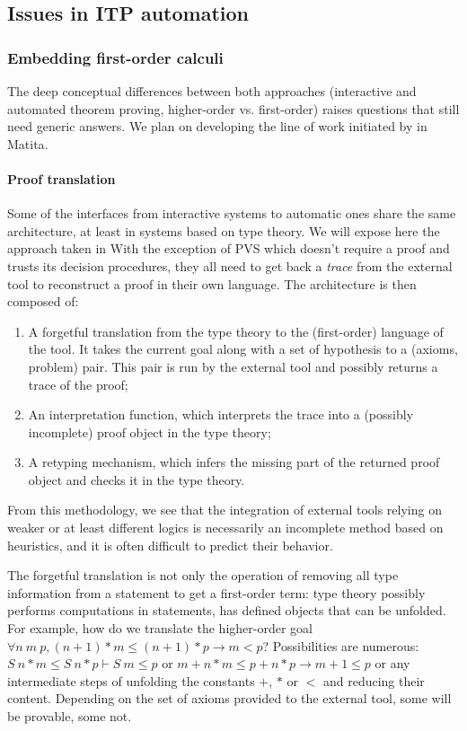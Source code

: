 \documentclass[twoside,a4paper,12pt]{article}
\begin{document}
\subsection{Issues in ITP automation}

\subsubsection{Embedding first-order calculi}

The deep conceptual differences between both approaches (interactive
and automated theorem proving, higher-order vs. first-order) raises
questions that still need generic answers. We plan on developing the
line of work initiated by \cite{asperti2010paramodulation} in
\textsf{Matita}.

\paragraph{Proof translation}

Some of the interfaces from interactive systems to automatic ones
share the same architecture, at least in systems based on type theory.
We will expose here the approach taken in
\cite{asperti2010paramodulation} With the exception of \textsf{PVS}
which doesn't require a proof and trusts its decision procedures, they
all need to get back a \emph{trace} from the external tool to
reconstruct a proof in their own language. The architecture is then
composed of:
\begin{enumerate}
\item A forgetful translation from the type theory to the
  (first-order) language of the tool. It takes the current goal along
  with a set of hypothesis to a (axioms, problem) pair. This pair is
  run by the external tool and possibly returns a trace of the proof;
\item An interpretation function, which interprets the trace into a
  (possibly incomplete) proof object in the type theory;
\item A retyping mechanism, which infers the missing part of the
  returned proof object and checks it in the type theory.
\end{enumerate}

From this methodology, we see that the integration of external tools
relying on weaker or at least different logics is necessarily an
incomplete method based on heuristics, and it is often difficult to
predict their behavior.

The forgetful translation is not only the operation of removing all
type information from a statement to get a first-order term: type
theory possibly performs computations in statements, has defined
objects that can be unfolded. For example, how do we translate the
higher-order goal $\forall n\ m\ p, (n+1) * m \leq (n+1) * p \to m <
p$? Possibilities are numerous: $S\ n * m \leq S\ n * p \vdash S\
m\leq p$ or $m + n * m \leq p + n * p \to m+1 \leq p$ or any
intermediate steps of unfolding the constants $+$, $*$ or $<$ and
reducing their content. Depending on the set of axioms provided to the
external tool, some will be provable, some not.
\end{document}
